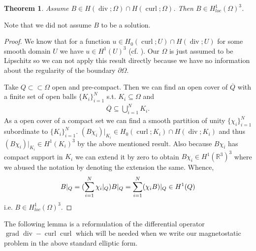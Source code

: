 \documentclass[12pt,a4paper]{article}
\numberwithin{equation}{subsection}
\numberwithin{lemma}{subsection}
\newtheorem{theorem}[lemma]{Theorem}
\theoremstyle{definition}
\DeclareMathOperator{\curl}{curl}
\DeclareMathOperator{\diver}{div}
\DeclareMathOperator{\grad}{grad}
\newcommand{\real}{\mathbb{R}}
\begin{document}
\begin{theorem}\label{thm:solution_in_H1loc}
    Assume $B \in H(\diver;\Omega) \cap H(\curl;\Omega)$. Then 
    $B \in H^1_{loc}(\Omega)^3$.
\end{theorem}
\noindent Note that we did not assume $B$ to be a solution.
\begin{proof}
    We know that for a function $u \in H_0(\curl;U) \cap H(\diver;U)$ 
    for some smooth domain $U$ we have $u \in H^1(U)^3$ 
    (cf. \cite[Remark 3.48]{monk}). Our $\Omega$ is just assumed to be Lipschitz 
    so we can not apply this result directly because we have no information
    about the regularity of the boundary $\partial \Omega$.

    Take $Q \subset\subset \Omega$ open and pre-compact. 
    Then we can find an open 
    cover of $\overline{Q}$ with a finite set of open balls $\{K_i\}_{i=1}^N$
    s.t. $K_i \subseteq \Omega$ and 
    \begin{align*}
        \overline{Q} \subseteq \bigcup\limits_{i=1}^N K_i.
    \end{align*}
    As a open cover of a compact set we can find a smooth partition of unity 
    $\{\chi_i\}_{i=1}^N$ subordinate to $\{K_i\}_{i=1}^N$. 
    $(B \chi_i)|_{K_i} \in H_0(\curl;K_i) \cap H(\diver;K_i)$ and thus 
    $(B \chi_i)|_{K_i} \in H^1(K_i)^3$ by the above mentioned result. 
    Also because $B \chi_i$ has compact support in $K_i$ we can extend it by 
    zero to obtain
    $B \chi_i \in H^1(\real^3)^3$ where we abused the notation by denoting 
    the extension the same. Whence,
    \begin{align*}
        B|_Q = \large( \sum\limits_{i=1}^N \chi_i |_Q \large) B|_Q = 
        \sum\limits_{i=1}^N (\chi_i B)|_Q \in H^1(Q)
    \end{align*}
    i.e. $B \in H^1_{loc}(\Omega)^3$.
\end{proof}

The following lemma is a reformulation of the differential operator 
$\grad \diver - \curl \curl$ which will be needed when we write our 
magnetostatic problem in the above standard elliptic form.
\end{document}
